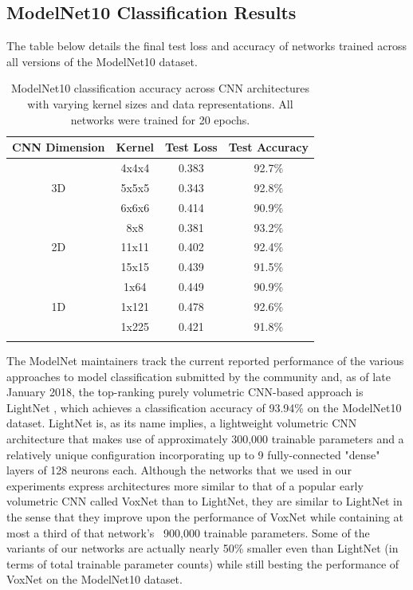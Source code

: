 \documentclass{article}
\begin{document}
\subsection{ModelNet10 Classification Results}

The table below details the final test loss and accuracy of networks trained across all versions of the ModelNet10 dataset.

\begin{table}[h]
\centering
\begin{tabular}[t]{cccc}
\toprule
CNN Dimension & Kernel & Test Loss & Test Accuracy\\
\midrule
 & 4x4x4 & 0.383 & 92.7\% \\

3D & 5x5x5 & 0.343 & 92.8\% \\

 & 6x6x6 & 0.414 & 90.9\% \\
\midrule
 & 8x8 & 0.381 & 93.2\% \\

2D & 11x11 & 0.402 & 92.4\% \\

 & 15x15 & 0.439 & 91.5\% \\
\midrule
 & 1x64 & 0.449 & 90.9\% \\

1D & 1x121 & 0.478 & 92.6\% \\

 & 1x225 & 0.421 & 91.8\% \\
\bottomrule \\
\end{tabular}
\caption{ModelNet10 classification accuracy across CNN architectures with varying kernel sizes and data representations. All networks were trained for 20 epochs.}
\label{table:2}
\end{table}

The ModelNet maintainers track the current reported performance of the various approaches to model classification submitted by the community and, as of late January 2018, the top-ranking purely volumetric CNN-based approach is LightNet \cite{LightNet}, which achieves a classification accuracy of 93.94\% on the ModelNet10 dataset. LightNet is, as its name implies, a lightweight volumetric CNN architecture that makes use of approximately 300,000 trainable parameters and a relatively unique configuration incorporating up to 9 fully-connected "dense" layers of 128 neurons each. Although the networks that we used in our experiments express architectures more similar to that of a popular early volumetric CNN called VoxNet \cite{maturana2015voxnet} than to LightNet, they are similar to LightNet in the sense that they improve upon the performance of VoxNet while containing at most a third of that network's ~900,000 trainable parameters. Some of the variants of our networks are actually nearly 50\% smaller even than LightNet (in terms of total trainable parameter counts) while still besting the performance of VoxNet on the ModelNet10 dataset. 
\end{document}
